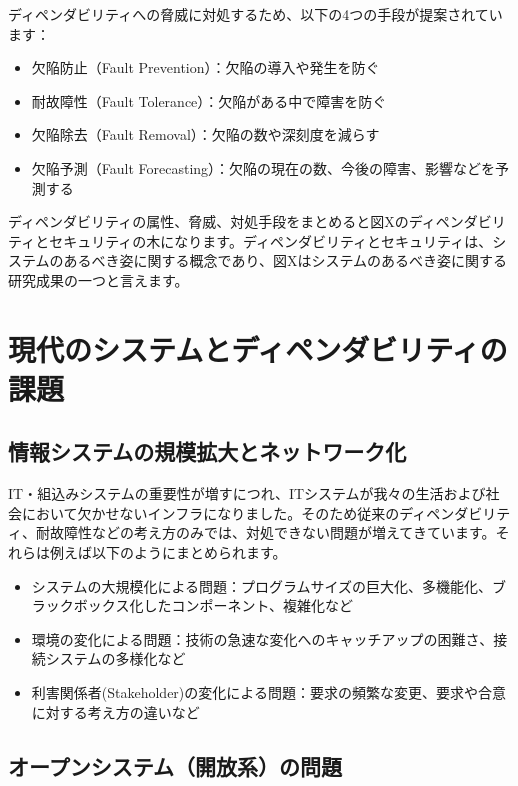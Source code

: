 ディペンダビリティへの脅威に対処するため、以下の4つの手段が提案されています：
\begin{itemize}
\item 欠陥防止（Fault Prevention）：欠陥の導入や発生を防ぐ
\item 耐故障性（Fault Tolerance）：欠陥がある中で障害を防ぐ
\item 欠陥除去（Fault Removal）：欠陥の数や深刻度を減らす
\item 欠陥予測（Fault Forecasting）：欠陥の現在の数、今後の障害、影響などを予測する
\end{itemize}

ディペンダビリティの属性、脅威、対処手段をまとめると図Xのディペンダビリティとセキュリティの木になります。ディペンダビリティとセキュリティは、システムのあるべき姿に関する概念であり、図Xはシステムのあるべき姿に関する研究成果の一つと言えます。



\section{現代のシステムとディペンダビリティの課題}

\subsection{情報システムの規模拡大とネットワーク化}

IT・組込みシステムの重要性が増すにつれ、ITシステムが我々の生活および社会において欠かせないインフラになりました。そのため従来のディペンダビリティ、耐故障性などの考え方のみでは、対処できない問題が増えてきています。それらは例えば以下のようにまとめられます。

\begin{itemize}
\item システムの大規模化による問題：プログラムサイズの巨大化、多機能化、ブラックボックス化したコンポーネント、複雑化など
\item 環境の変化による問題：技術の急速な変化へのキャッチアップの困難さ、接続システムの多様化など
\item 利害関係者(Stakeholder)の変化による問題：要求の頻繁な変更、要求や合意に対する考え方の違いなど
\end{itemize}



\subsection{オープンシステム（開放系）の問題}

